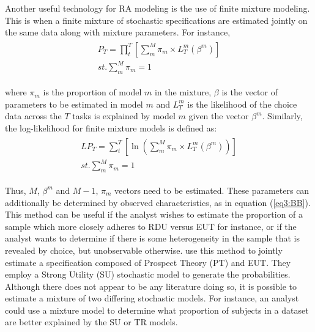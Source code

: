 \documentclass[../main.tex]{subfiles}
\begin{document}
Another useful technology for RA modeling is the use of finite mixture modeling.
This is when a finite mixture of stochastic specifications are estimated jointly on the same data along with mixture parameters.
For instance,
\begin{align}
	\label{eq3:PT_Mix}
	\begin{split}
		\bm{\mathit{P_T}} = \prod_t^T \left[ \sum_m^M \pi_m \times L_T^m(\beta^m) \right]\\ 
		\mathit{st.} \sum_m^M \pi_m = 1
	\end{split}
\end{align}

\noindent where $\pi_m$ is the proportion of model $m$ in the mixture, $\beta$ is the vector of parameters to be estimated in model $m$ and $L_T^m$ is the likelihood of the choice data across the $T$ tasks is explained by model $m$ given the vector $\beta^m$.
Similarly, the log-likelihood for finite mixture models is defined as:
\begin{align}
	\label{eq3:LPT_Mix}
	\begin{split}
		\bm{\mathit{LP_T}} = \sum_t^T \left[ \ln \left( \sum_m^M \pi_m \times L_T^m(\beta^m) \right) \right]\\ 
		\mathit{st.} \sum_m^M \pi_m = 1
	\end{split}
\end{align}

\noindent Thus, $M$, $\beta^m$ and $M-1$, $\pi_m$ vectors need to be estimated.
These parameters can additionally be determined by observed characteristics, as in equation (\ref{eq3:BB}).
This method can be useful if the analyst wishes to estimate the proportion of a sample which more closely adheres to RDU versus EUT for instance, or if the analyst wants to determine if there is some heterogeneity in the sample that is revealed by choice, but unobservable otherwise.
\textcite[141]{Harrison2008a} use this method to jointly estimate a specification composed of Prospect Theory (PT) and EUT.
They employ a Strong Utility (SU) stochastic model to generate the probabilities.
Although there does not appear to be any literature doing so, it is possible to estimate a mixture of two differing stochastic models.
For instance, an analyst could use a mixture model to determine what proportion of subjects in a dataset are better explained by the SU or TR models.{\footnotemark}

\addtocounter{footnote}{-1}
 
\end{document}

